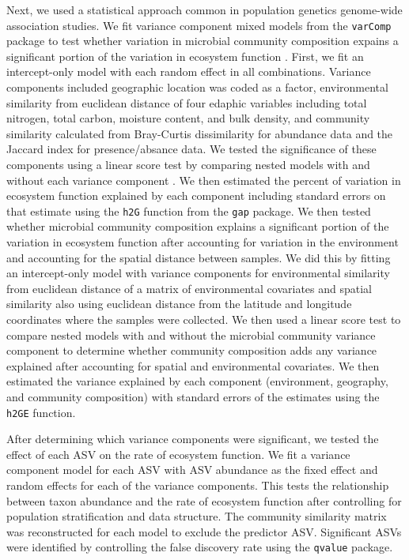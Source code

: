\documentclass{article}
\begin{document}
Next, we used a statistical approach common in population genetics genome-wide
association studies. We fit variance component mixed models from the
\texttt{varComp} package to test whether variation in microbial
community composition expains a significant portion of the variation in
ecosystem function \citep{qu2013}. First, we fit an intercept-only model with
each random effect in all combinations. Variance components included geographic location was coded as a factor, environmental
similarity from euclidean distance of four edaphic variables including total
nitrogen, total carbon, moisture content, and bulk density, and
community similarity calculated from Bray-Curtis dissimilarity for abundance
data and the Jaccard index for presence/absance data. We tested the significance
of these components using a linear score test by comparing nested models with and
without each variance component \citep{qu2013}. We then estimated
the percent of variation in ecosystem function explained by each component 
including standard errors on that estimate 
using the \texttt{h2G} function from the
\texttt{gap} package. We then tested whether microbial community composition explains a
significant portion of the variation in ecosystem function after accounting for
variation in the environment and accounting for the spatial distance between
samples. We did this by fitting an intercept-only model with variance components
for environmental similarity from euclidean distance of a matrix of
environmental covariates and spatial similarity
also using euclidean distance from the latitude and longitude coordinates where
the samples were collected. We then used a linear score test to compare
nested models with and without the microbial community variance component to
determine whether community composition adds any variance explained after
accounting for spatial and environmental covariates. We then estimated the
variance explained by each component (environment, geography, and community
composition) with standard errors of the estimates using the \texttt{h2GE}
function. 

After determining which variance components were significant, we tested the
effect of each ASV on the rate of ecosystem function. We fit a variance
component model for each ASV with ASV abundance as the fixed effect and random
effects for each of the variance components. This tests the relationship between
taxon abundance and the rate of ecosystem function after controlling for
population stratification and data structure. The community similarity matrix
was reconstructed for each model to exclude the predictor ASV. 
Significant ASVs were identified by controlling the false discovery rate using
the \texttt{qvalue} package.
\end{document}
